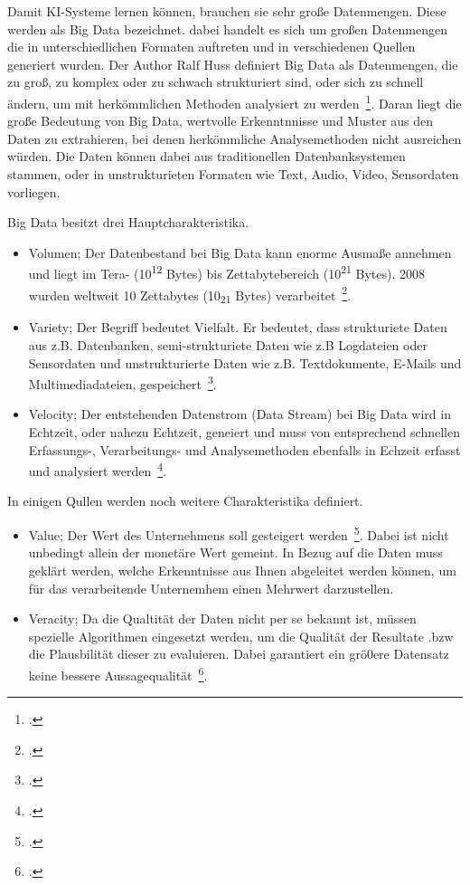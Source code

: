 Damit {KI}-Systeme lernen können, brauchen sie sehr große Datenmengen. Diese werden als Big Data bezeichnet. dabei handelt es sich um großen Datenmengen die in unterschiedlichen Formaten auftreten
und in verschiedenen Quellen generiert wurden. Der Author Ralf Huss definiert Big Data als Datenmengen, die zu groß, zu komplex oder zu schwach strukturiert sind, oder sich zu schnell ändern, um mit herkömmlichen
Methoden analysiert zu werden~\footcite[][]{Huss.2019}. Daran liegt die große Bedeutung von Big Data, wertvolle Erkenntnnisse und Muster aus den Daten zu extrahieren,
bei denen herkömmliche Analysemethoden nicht ausreichen würden.
Die Daten können dabei aus traditionellen Datenbanksystemen stammen, oder in unstrukturieten Formaten wie Text, Audio, Video, Sensordaten vorliegen.

Big Data besitzt drei Hauptcharakteristika. 

\begin{itemize}
    \item Volumen; Der Datenbestand bei Big Data kann enorme Ausmaße annehmen und liegt im Tera- (10\textsuperscript{12} Bytes) bis Zettabytebereich (10\textsuperscript{21} Bytes). 2008 wurden weltweit 10 Zettabytes (10\textsubscript{21} Bytes) verarbeitet~\footcite[\vglf][]{Huss.2019}. 
    \item Variety; Der Begriff bedeutet Vielfalt. Er bedeutet, dass strukturiete Daten aus z.B. Datenbanken, semi-strukturiete Daten wie z.B Logdateien oder Sensordaten und unstrukturierte Daten wie z.B. Textdokumente, E-Mails und Multimediadateien, gespeichert~\footcite[\vglf][]{Fasel.2019}.
    \item Velocity; Der entstehenden Datenstrom (Data Stream) bei Big Data wird in Echtzeit, oder nahezu Echtzeit, geneiert und muss von entsprechend schnellen Erfassungs-, Verarbeitungs- und Analysemethoden
    ebenfalls in Echzeit erfasst und analysiert werden~\footcite[\vglf][]{Fasel.2019}.
\end{itemize}


In einigen Qullen werden noch weitere Charakteristika definiert. 

\begin{itemize}
    \item Value; Der Wert des Unternehmens soll gesteigert werden~\footcite[\vglf][]{Fasel.2019}. Dabei ist nicht unbedingt allein der monetäre Wert gemeint. In Bezug auf die Daten muss geklärt werden,
    welche Erkenntnisse aus Ihnen abgeleitet werden können, um für das verarbeitende Unternemhem einen Mehrwert darzustellen. 
    \item Veracity; Da die Qualtität der Daten nicht per se bekannt ist, müssen spezielle Algorithmen eingesetzt werden, um die Qualität der Resultate .bzw die Plausbilität dieser zu evaluieren. Dabei garantiert
 ein grö0ere Datensatz keine bessere Aussagequalität~\footcite[\vglf][]{Fasel.2019}.
\end{itemize}

